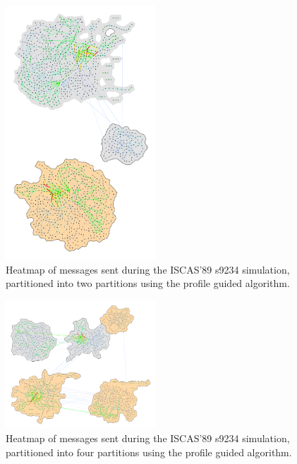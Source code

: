 \documentclass[11pt]{book}
\begin{document}
\begin{figure}
\centering
\includegraphics[clip=true,width=0.5\textwidth]{figs/s9234_2part.pdf}
\caption{Heatmap of messages sent during the ISCAS'89 s9234 simulation, partitioned into two partitions using the profile guided algorithm.}
\end{figure}

\begin{figure}
\centering
\includegraphics[clip=true,width=0.5\textwidth]{figs/s9234_4part.pdf}
\caption{Heatmap of messages sent during the ISCAS'89 s9234 simulation, partitioned into four partitions using the profile guided algorithm.}
\end{figure}
\end{document}
